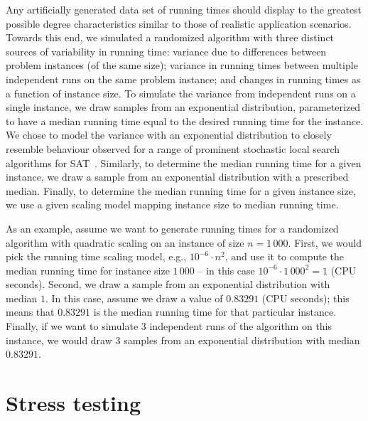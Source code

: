 \documentclass[aic]{iosart2x}
\begin{document}
Any artificially generated data set of running times should display to the greatest possible degree characteristics similar to those of realistic application scenarios. 
Towards this end, we simulated a randomized algorithm with three distinct sources of variability in running time: 
variance due to differences between problem instances (of the same size); variance in running times between multiple independent runs on the same problem instance; and changes in running times as a function of instance size.
To simulate the variance from independent runs on a single instance, we draw samples from an exponential distribution, parameterized to have a median running time equal to the desired running time for the instance. 
We chose to model the variance with an exponential distribution to closely resemble behaviour observed for a range of prominent stochastic local search algorithms for SAT~\cite{HooStu99}. 
Similarly, to determine the median running time for a given instance, we draw a sample from an exponential distribution with a prescribed median.
Finally, to determine the median running time for a given instance size, we use a given scaling model mapping instance size to median running time.

As an example, assume we want to generate running times for a randomized algorithm with quadratic scaling on an instance of size $n = 1\,000$. 
First, we would pick the running time scaling model, e.g., $10^{-6} \cdot n^2$, and use it to compute the median running time for instance size $1\,000$ -- in this case $10^{-6} \cdot 1\,000^2 = 1$ (CPU seconds). 
Second, we draw a sample from an exponential distribution with median $1$. 
In this case, assume we draw a value of $0.83291$ (CPU seconds); this means that $0.83291$ is the median running time for that particular instance. 
Finally, if we want to simulate 3 independent runs of the algorithm on this instance, we would draw 3 samples from an exponential distribution with median $0.83291$.


\section{Stress testing}
\label{sec:Stress Testing}
\end{document}
